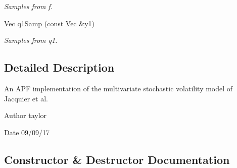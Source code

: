 \begin{DoxyCompactItemize}
\begin{DoxyCompactList}\small\item\em Samples from f. \end{DoxyCompactList}\item 
\hyperlink{pmfs_8h_a4c7df05c6f5e8a0d15ae14bcdbc07152}{Vec} \hyperlink{classJacEtAlAPF_afdd084c634e7ad591499a6c8c90ee9d0}{q1\+Samp} (const \hyperlink{pmfs_8h_a4c7df05c6f5e8a0d15ae14bcdbc07152}{Vec} \&y1)
\begin{DoxyCompactList}\small\item\em Samples from q1. \end{DoxyCompactList}\end{DoxyCompactItemize}


\subsection{Detailed Description}
An A\+PF implementation of the multivariate stochastic volatility model of Jacquier et al. 

\begin{DoxyAuthor}{Author}
taylor 
\end{DoxyAuthor}
\begin{DoxyDate}{Date}
09/09/17 
\end{DoxyDate}


\subsection{Constructor \& Destructor Documentation}
